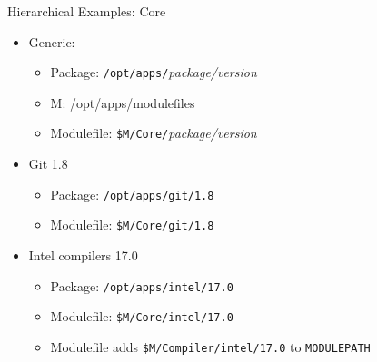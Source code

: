 \documentclass[dvipsnames,aspectratio=169]{beamer}
\begin{document}
\begin{frame}{Hierarchical Examples: Core}
  \begin{itemize}
    \item Generic:
      \begin{itemize}
        \item Package: \texttt{/opt/apps/}\emph{package/version}
        \item M: {\color{blue}/opt/apps/modulefiles}
        \item Modulefile: \texttt{{\color{blue}\$M}/Core/}\emph{package/version}
      \end{itemize}
    \item Git 1.8
      \begin{itemize}
        \item Package: \texttt{/opt/apps/git/1.8}
        \item Modulefile: \texttt{{\color{blue}\$M}/Core/git/1.8}
      \end{itemize}
    \item Intel compilers 17.0
      \begin{itemize}
        \item Package: \texttt{/opt/apps/intel/17.0}
        \item Modulefile: \texttt{{\color{blue}\$M}/Core/intel/17.0}
        \item Modulefile adds \texttt{{\color{blue}\$M}/Compiler/intel/17.0} to \texttt{MODULEPATH}
      \end{itemize}
  \end{itemize}
\end{frame}
\end{document}
